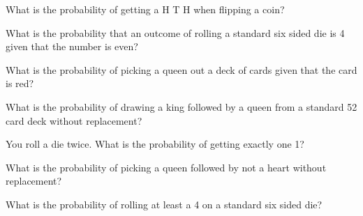 \begin{problem}
\begin{subproblem}
  \item What is the probability of getting a H T H when flipping a
    coin? 

    \vspace{2em}

  \item What is the probability that an outcome of rolling a standard
    six sided die is 4 given that the number is even?

    \vspace{2em}

  \item What is the probability of picking a queen out a deck of cards
    given that the card is red?

    \vspace{2em}

  \item What is the probability of drawing a king followed by a queen
    from a standard 52 card deck without replacement?

    \vspace{2em}

  \item You roll a die twice. What is the probability of getting
    exactly one 1?

    \vspace{2em}

  \item What is the probability of picking a queen followed by not a
    heart without replacement?

    \vspace{2em}

  \item What is the probability of rolling at least a 4 on a standard
    six sided die?

    \vspace{2em}

  \end{subproblem}

\end{problem}




